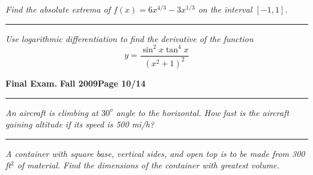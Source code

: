 \documentclass[12pt]{article}
\begin{document}
\bigskip
{\problem[10 pts] \em Find the absolute extrema of $f(x) = 6x^{4/3} - 3x^{1/3}$ on the interval $[-1,1]$.}
\vspace{6cm}
\begin{flushright}
\end{flushright}
\hrule
{\problem[10 pts] \em Use logarithmic differentiation to find the
  derivative of the function 
\begin{equation*}
y=\frac{\sin^2 x \tan^4 x}{(x^2+1)^2}
\end{equation*}
\vspace{7cm}
\begin{flushright}
\end{flushright}
\newpage

\hfill{\large\bf Final Exam.}\hfill{\large\bf
  Fall 2009}\hfill{\large\bf Page 10/14}\hrule

\bigskip
{\problem[10 pts] \em An aircraft is climbing at $30^o$ angle to the horizontal.  How fast is the aircraft gaining altitude if its speed is 500 mi/h?}
\vspace{6cm}
\begin{flushright}
\end{flushright}
\hrule
{\problem[20 pts] \em A container with square base, vertical sides, and open top is to be made from 300 ft$^2$ of material.  Find the dimensions of the container with greatest volume.}
\vspace{11cm}
\begin{flushright}
\end{flushright}
\newpage

}
\end{document}
